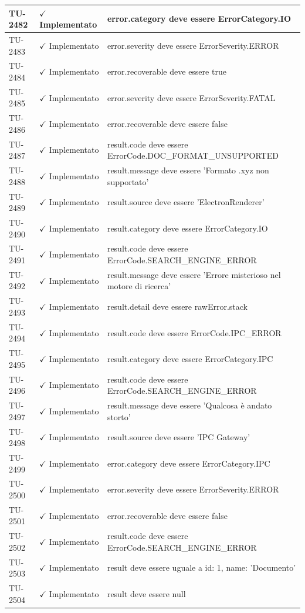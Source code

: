 ﻿\documentclass[a4paper,12pt]{article}
\newcommand{\ok}{\textcolor{green!60!black}{$\checkmark$ Implementato}}
\begin{document}
\begin{longtable}{|p{2cm}|p{3.5cm}|p{9.5cm}|}
\hline
TU-2482 & \ok & error.category deve essere ErrorCategory.IO \\
\hline
TU-2483 & \ok & error.severity deve essere ErrorSeverity.ERROR \\
\hline
TU-2484 & \ok & error.recoverable deve essere true \\
\hline
TU-2485 & \ok & error.severity deve essere ErrorSeverity.FATAL \\
\hline
TU-2486 & \ok & error.recoverable deve essere false \\
\hline
TU-2487 & \ok & result.code deve essere ErrorCode.DOC\_FORMAT\_UNSUPPORTED \\
\hline
TU-2488 & \ok & result.message deve essere 'Formato .xyz non supportato' \\
\hline
TU-2489 & \ok & result.source deve essere 'ElectronRenderer' \\
\hline
TU-2490 & \ok & result.category deve essere ErrorCategory.IO \\
\hline
TU-2491 & \ok & result.code deve essere ErrorCode.SEARCH\_ENGINE\_ERROR \\
\hline
TU-2492 & \ok & result.message deve essere 'Errore misterioso nel motore di ricerca' \\
\hline
TU-2493 & \ok & result.detail deve essere rawError.stack \\
\hline
TU-2494 & \ok & result.code deve essere ErrorCode.IPC\_ERROR \\
\hline
TU-2495 & \ok & result.category deve essere ErrorCategory.IPC \\
\hline
TU-2496 & \ok & result.code deve essere ErrorCode.SEARCH\_ENGINE\_ERROR \\
\hline
TU-2497 & \ok & result.message deve essere 'Qualcosa è andato storto' \\
\hline
TU-2498 & \ok & result.source deve essere 'IPC Gateway' \\
\hline
TU-2499 & \ok & error.category deve essere ErrorCategory.IPC \\
\hline
TU-2500 & \ok & error.severity deve essere ErrorSeverity.ERROR \\
\hline
TU-2501 & \ok & error.recoverable deve essere false \\
\hline
TU-2502 & \ok & result.code deve essere ErrorCode.SEARCH\_ENGINE\_ERROR \\
\hline
TU-2503 & \ok & result deve essere uguale a { id: 1, name: 'Documento' } \\
\hline
TU-2504 & \ok & result deve essere null \\

\end{longtable}
\end{document}
